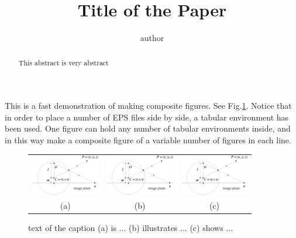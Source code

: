 \documentclass{article}
\title{Title of the Paper}
\author{author}
\begin{document}
\maketitle
\begin{abstract}
This abstract is very abstract
\end{abstract}

This is a fast demonstration of making composite figures. See Fig.\ref{fig:figs_tst}.
Notice that in order to place a number of EPS files side by side, a tabular environment has been used.
One figure can hold any number of tabular environments inside, and in this way make a composite figure of a variable number of figures in each line.

\begin{figure}[H]
	\centering
		\begin{tabular}{ccc}
		   \includegraphics[width=3cm]{sph_proj.eps} &
		   \includegraphics[width=3cm]{sph_proj.eps} &
		   \hspace{1cm} \includegraphics[width=3cm]{sph_proj.eps} \\
		   (a) & (b) & (c) \\
		\end{tabular}
	\caption{text of the caption (a) is ... (b) illustrates ... (c) shows ...}
	\label{fig:figs_tst}
\end{figure}
\end{document}
